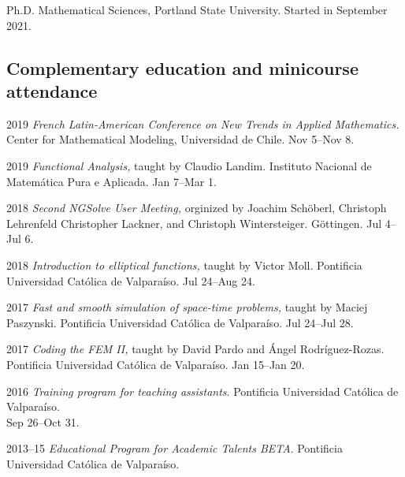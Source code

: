 \documentclass[12pt,letterpaper]{report}
\begin{document}
    \begin{tablist}
        
        \item[Ph.D.] \tab Mathematical Sciences, Portland State University. Started in September 2021.
    \end{tablist}

    \subsection*{Complementary education and minicourse attendance}

    \begin{tablist}

        \item[2019] \tab \emph{French Latin-American Conference on New Trends in Applied Mathematics.} Center for Mathematical Modeling, Universidad de Chile. Nov 5--Nov 8.

        \item[2019] \tab \emph{Functional Analysis,} taught by Claudio Landim. Instituto Nacional de Matem\'atica Pura e Aplicada. Jan 7--Mar 1.
        
        \item[2018] \tab \emph{Second NGSolve User Meeting,} orginized by Joachim Schöberl, Christoph Lehrenfeld
        Christopher Lackner, and Christoph Wintersteiger. Göttingen. Jul 4--Jul 6. 

        \item[2018] \tab \emph{Introduction to elliptical functions,} taught by Victor Moll. Pontificia Universidad Cat\'olica de Valpara\'iso. Jul 24--Aug 24.
        
        \item[2017] \tab \emph{Fast and smooth simulation of space-time problems,} taught by Maciej Paszynski. Pontificia Universidad Cat\'olica de Valpara\'iso. Jul 24--Jul 28.
        
        \item[2017] \tab \emph{Coding the FEM II,} taught by David Pardo and \'Angel Rodr\'iguez-Rozas. Pontificia Universidad Cat\'olica de Valpara\'iso. Jan 15--Jan 20. 

        \item[2016]  \tab \emph{Training program for teaching assistants}. Pontificia Universidad Cat\'olica de Valpara\'iso.\\ Sep 26--Oct 31.
        
        \item[2013--15] \tab \emph{Educational Program for Academic Talents BETA}. Pontificia Universidad Cat\'olica de Valpara\'iso.

    \end{tablist}
\end{document}
